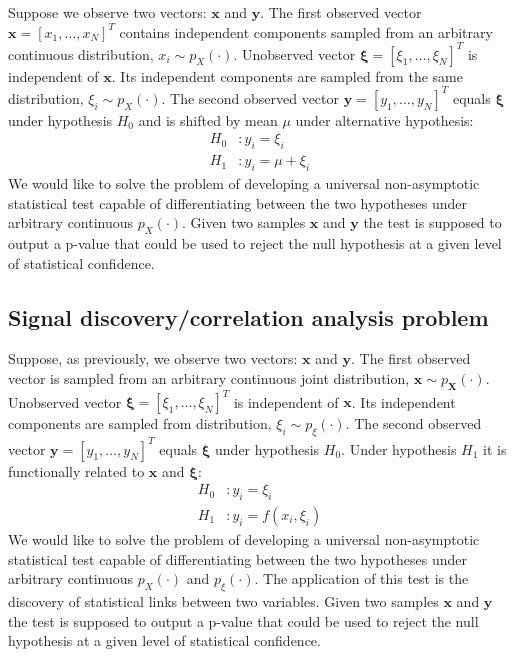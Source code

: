 \documentclass[]{article}
\renewcommand{\vec}[1]{\mathbf{#1}}
\begin{document}
Suppose we observe two vectors: $\vec{x}$ and $\vec{y}$. The first observed vector $\vec{x} = [x_1, \ldots, x_N]^T$ contains independent components sampled from an arbitrary continuous distribution, $x_i \sim p_X(\cdot)$. Unobserved vector $\vec{\bm \xi} = [\xi_1, \ldots, \xi_N]^T$ is independent of $\vec{x}$. Its independent components are sampled from the same distribution, $\xi_i \sim p_X(\cdot)$. The second observed vector $\vec{y} = [y_1, \ldots, y_N]^T$ equals $\vec{\bm \xi}$ under hypothesis $H_0$ and is shifted by mean $\mu$ under alternative hypothesis:
\begin{align*}
H_0 &: y_i = \xi_i \\
H_1 &: y_i = \mu + \xi_i
\end{align*}
We would like to solve the problem of developing a universal non-asymptotic statistical test capable of differentiating between the two hypotheses under arbitrary continuous $p_X(\cdot)$. Given two samples $\vec{x}$ and $\vec{y}$ the test is supposed to output a p-value that could be used to reject the null hypothesis at a given level of statistical confidence.

\subsection{Signal discovery/correlation analysis problem}

Suppose, as previously, we observe two vectors: $\vec{x}$ and $\vec{y}$. The first observed vector is sampled from an arbitrary continuous joint distribution, $\vec{x} \sim p_\vec{X}(\cdot)$. Unobserved vector $\vec{\bm \xi} = [\xi_1, \ldots, \xi_N]^T$ is independent of $\vec{x}$. Its independent components are sampled from distribution, $\xi_i \sim p_{\xi}(\cdot)$. The second observed vector $\vec{y} = [y_1, \ldots, y_N]^T$ equals $\vec{\bm \xi}$ under hypothesis $H_0$. Under hypothesis $H_1$ it is functionally related to  $\vec{x}$ and $\vec{\bm \xi}$:
\begin{align*}
H_0 &: y_i = \xi_i \\
H_1 &: y_i = f(x_i, \xi_i)
\end{align*}
We would like to solve the problem of developing a universal non-asymptotic statistical test capable of differentiating between the two hypotheses under arbitrary continuous $p_X(\cdot)$ and $p_{\xi}(\cdot)$. The application of this test is the discovery of statistical links between two variables. Given two samples $\vec{x}$ and $\vec{y}$ the test is supposed to output a p-value that could be used to reject the null hypothesis at a given level of statistical confidence.
\end{document}
